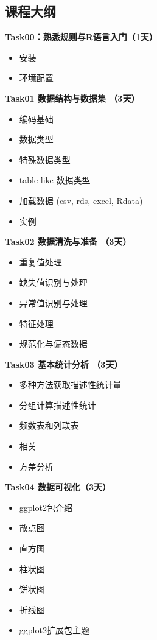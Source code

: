 \documentclass[]{ctexbook}
\providecommand{\tightlist}{%
  \setlength{\itemsep}{0pt}\setlength{\parskip}{0pt}}
\begin{document}
\hypertarget{ux8bfeux7a0bux5927ux7eb2}{%
\subsection*{课程大纲}\label{ux8bfeux7a0bux5927ux7eb2}}


\textbf{Task00：熟悉规则与R语言入门（1天）}

\begin{itemize}
\tightlist
\item
  安装
\item
  环境配置
\end{itemize}

\textbf{Task01 数据结构与数据集 （3天）}

\begin{itemize}
\tightlist
\item
  编码基础
\item
  数据类型
\item
  特殊数据类型
\item
  table like 数据类型
\item
  加载数据 (csv, rds, excel, Rdata)
\item
  实例
\end{itemize}

\textbf{Task02 数据清洗与准备 （3天）}

\begin{itemize}
\tightlist
\item
  重复值处理
\item
  缺失值识别与处理
\item
  异常值识别与处理
\item
  特征处理
\item
  规范化与偏态数据
\end{itemize}

\textbf{Task03 基本统计分析 （3天）}

\begin{itemize}
\tightlist
\item
  多种方法获取描述性统计量
\item
  分组计算描述性统计
\item
  频数表和列联表
\item
  相关
\item
  方差分析
\end{itemize}

\textbf{Task04 数据可视化（3天）}

\begin{itemize}
\tightlist
\item
  ggplot2包介绍
\item
  散点图
\item
  直方图
\item
  柱状图
\item
  饼状图
\item
  折线图
\item
  ggplot2扩展包主题
\end{itemize}
\end{document}

